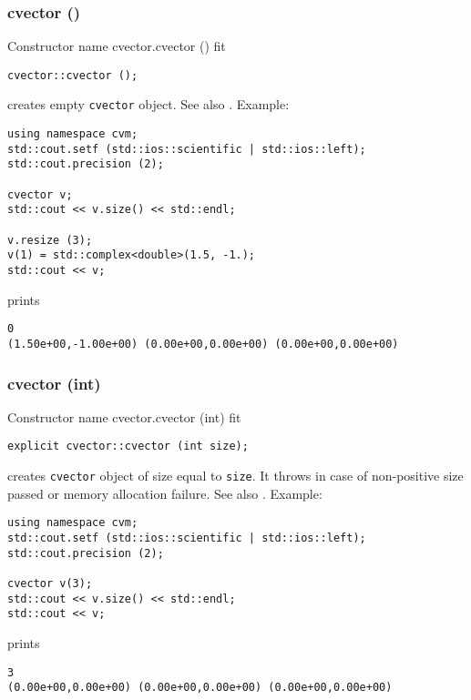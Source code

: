 \subsubsection{cvector ()}
Constructor%
\pdfdest name {cvector.cvector ()} fit
\begin{verbatim}
cvector::cvector ();
\end{verbatim}
creates  empty \verb"cvector" object.
See also .
Example:
\begin{Verbatim}
using namespace cvm;
std::cout.setf (std::ios::scientific | std::ios::left);
std::cout.precision (2);

cvector v;
std::cout << v.size() << std::endl;

v.resize (3);
v(1) = std::complex<double>(1.5, -1.);
std::cout << v;
\end{Verbatim}
prints
\begin{Verbatim}
0
(1.50e+00,-1.00e+00) (0.00e+00,0.00e+00) (0.00e+00,0.00e+00)
\end{Verbatim}
\newpage


\subsubsection{cvector (int)}
Constructor%
\pdfdest name {cvector.cvector (int)} fit
\begin{verbatim}
explicit cvector::cvector (int size);
\end{verbatim}
creates \verb"cvector" object of size equal to \verb"size".
It throws  
in case of non-positive size passed or memory allocation failure.
See also .
Example:
\begin{Verbatim}
using namespace cvm;
std::cout.setf (std::ios::scientific | std::ios::left);
std::cout.precision (2);

cvector v(3);
std::cout << v.size() << std::endl;
std::cout << v;
\end{Verbatim}
prints
\begin{Verbatim}
3
(0.00e+00,0.00e+00) (0.00e+00,0.00e+00) (0.00e+00,0.00e+00)
\end{Verbatim}
\newpage



